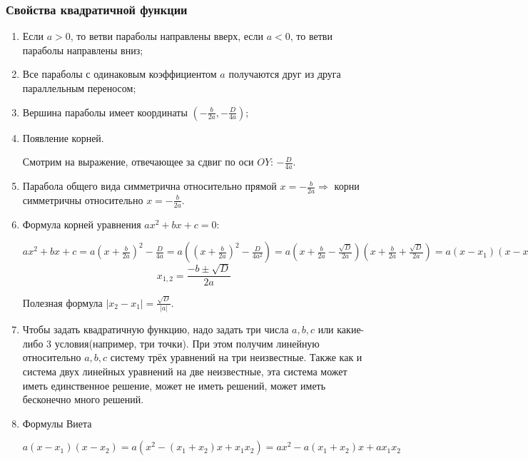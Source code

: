 \documentclass{article}
\begin{document}
    \subsubsection{Свойства квадратичной функции}

    \begin{enumerate}
        \item Если \(a>0\), то ветви параболы направлены вверх, если \(a<0\), то ветви параболы направлены вниз;
        \item Все параболы с одинаковым коэффициентом \(a\) получаются друг из друга параллельным переносом;
        \item Вершина параболы имеет координаты \((-\frac{b}{2a},-\frac{D}{4a})\);
        \item Появление корней.
    
        Смотрим на выражение, отвечающее за сдвиг по оси \(OY\): \(-\frac{D}{4a}\).
        \item Парабола общего вида симметрична относительно прямой \(x=-\frac{b}{2a} \Rightarrow\) корни симметричны относительно \(x=-\frac{b}{2a}\).
        \item Формула корней уравнения \(ax^2+bx+c=0\):
        
        \(ax^2+bx+c=a(x+\frac{b}{2a})^2-\frac{D}{4a}=a((x+\frac{b}{2a})^2-\frac{D}{4a^2})=a(x+\frac{b}{2a}-\frac{\sqrt{D}}{2a})(x+\frac{b}{2a}+\frac{\sqrt{D}}{2a})=a(x-x_1)(x-x_2)\)
        \begin{equation*}
            x_{1,2}=\frac{-b\pm\sqrt{D}}{2a}
        \end{equation*}

        Полезная формула \(|x_2-x_1|=\frac{\sqrt{D}}{|a|}\).
        \item Чтобы задать квадратичную функцию, надо задать три числа \(a, b, c\) или какие-либо 3 условия(например, три точки).
        При этом получим линейную относительно \(a, b, c\) систему трёх уравнений на три неизвестные. Также как и система двух линейных уравнений на две неизвестные, эта система может иметь единственное решение, может не иметь решений, может иметь бесконечно много решений.
        \item Формулы Виета
        
        \(a(x-x_1)(x-x_2)=a(x^2-(x_1+x_2)x+x_1x_2)=ax^2-a(x_1+x_2)x+ax_1x_2\)


\end{enumerate}
\end{document}
